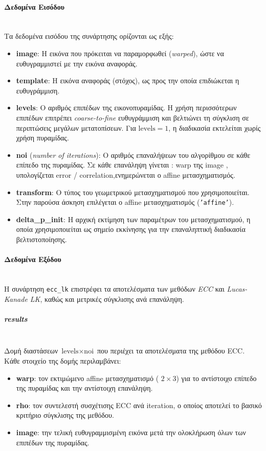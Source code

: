 \documentclass[12pt]{article}
\begin{document}
\paragraph{Δεδομένα Εισόδου}
\mbox{}\\
Τα δεδομένα εισόδου της συνάρτησης ορίζονται ως εξής:
\begin{itemize}
    \item \textbf{image}: Η εικόνα που πρόκειται να παραμορφωθεί (\textit{warped}), ώστε να ευθυγραμμιστεί με την εικόνα αναφοράς.
    
    \item \textbf{template}: Η εικόνα αναφοράς (στόχος), ως προς την οποία επιδιώκεται η ευθυγράμμιση.
    
    \item \textbf{levels}: Ο αριθμός επιπέδων της εικονοπυραμίδας. Η χρήση περισσότερων επιπέδων επιτρέπει \textit{coarse-to-fine} ευθυγράμμιση και βελτιώνει τη σύγκλιση σε περιπτώσεις μεγάλων μετατοπίσεων. Για \(\text{levels} = 1\), η διαδικασία εκτελείται χωρίς χρήση πυραμίδας.
    
    \item \textbf{noi} (\textit{number of iterations}): Ο αριθμός επαναλήψεων του αλγορίθμου σε κάθε επίπεδο της πυραμίδας. Σε κάθε επανάληψη γίνεται : warp της image , υπολογίζεται error / correlation,ενημερώνεται ο affine μετασχηματισμός.
    \item \textbf{transform}: Ο τύπος του γεωμετρικού μετασχηματισμού που χρησιμοποιείται. Στην παρούσα άσκηση επιλέγεται ο affine μετασχηματισμός (\texttt{'affine'}).
    
    \item \textbf{delta\_p\_init}: Η αρχική εκτίμηση των παραμέτρων του μετασχηματισμού, η οποία χρησιμοποιείται ως σημείο εκκίνησης για την επαναληπτική διαδικασία βελτιστοποίησης.
\end{itemize}


\paragraph{Δεδομένα Εξόδου}
\mbox{}\\
Η συνάρτηση \texttt{ecc\_lk} επιστρέφει τα αποτελέσματα των μεθόδων \textit{ECC} και \textit{Lucas-Kanade LK}, καθώς και μετρικές σύγκλισης ανά επανάληψη.

\subparagraph{\textbf{results}}
\mbox{}\\
Δομή διαστάσεων \(\text{levels} \times \text{noi}\) που περιέχει τα αποτελέσματα της μεθόδου ECC. Κάθε στοιχείο της δομής περιλαμβάνει:
\begin{itemize}
    \item \textbf{warp}: τον εκτιμώμενο affine μετασχηματισμό ( \(2 \times 3\)) για το αντίστοιχο επίπεδο της πυραμίδας και την αντίστοιχη επανάληψη.
    \item \textbf{rho}: τον συντελεστή συσχέτισης ECC ανά iteration, ο οποίος αποτελεί το βασικό κριτήριο σύγκλισης της μεθόδου.
    \item \textbf{image}: την τελική ευθυγραμμισμένη εικόνα μετά την ολοκλήρωση όλων των επιπέδων της πυραμίδας.
\end{itemize}
\end{document}
